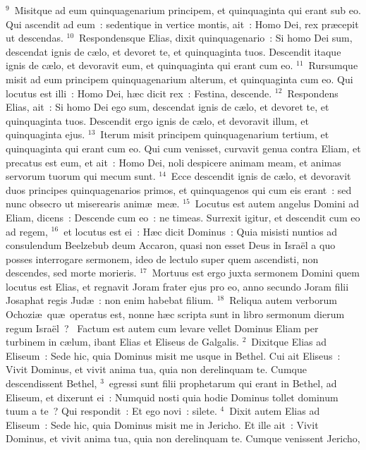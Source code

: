 ${}^{9}$~Misitque ad eum quinquagenarium principem, et quinquaginta qui erant sub eo. Qui ascendit ad eum~: sedentique in vertice montis, ait~: Homo Dei, rex pr\ae cepit ut descendas.
${}^{10}$~Respondensque Elias, dixit quinquagenario~: Si homo Dei sum, descendat ignis de c\ae lo, et devoret te, et quinquaginta tuos. Descendit itaque ignis de c\ae lo, et devoravit eum, et quinquaginta qui erant cum eo.
${}^{11}$~Rursumque misit ad eum principem quinquagenarium alterum, et quinquaginta cum eo. Qui locutus est illi~: Homo Dei, h\ae c dicit rex~: Festina, descende.
${}^{12}$~Respondens Elias, ait~: Si homo Dei ego sum, descendat ignis de c\ae lo, et devoret te, et quinquaginta tuos. Descendit ergo ignis de c\ae lo, et devoravit illum, et quinquaginta ejus.
${}^{13}$~Iterum misit principem quinquagenarium tertium, et quinquaginta qui erant cum eo. Qui cum venisset, curvavit genua contra Eliam, et precatus est eum, et ait~: Homo Dei, noli despicere animam meam, et animas servorum tuorum qui mecum sunt.
${}^{14}$~Ecce descendit ignis de c\ae lo, et devoravit duos principes quinquagenarios primos, et quinquagenos qui cum eis erant~: sed nunc obsecro ut miserearis anim\ae\ me\ae .
${}^{15}$~Locutus est autem angelus Domini ad Eliam, dicens~: Descende cum eo~: ne timeas. Surrexit igitur, et descendit cum eo ad regem,
${}^{16}$~et locutus est ei~: H\ae c dicit Dominus~: Quia misisti nuntios ad consulendum Beelzebub deum Accaron, quasi non esset Deus in Isra\"el a quo posses interrogare sermonem, ideo de lectulo super quem ascendisti, non descendes, sed morte morieris.
${}^{17}$~Mortuus est ergo juxta sermonem Domini quem locutus est Elias, et regnavit Joram frater ejus pro eo, anno secundo Joram filii Josaphat regis Jud\ae~: non enim habebat filium.
${}^{18}$~Reliqua autem verborum Ochozi\ae\ qu\ae\ operatus est, nonne h\ae c scripta sunt in libro sermonum dierum regum Isra\"el~?
~Factum est autem cum levare vellet Dominus Eliam per turbinem in c\ae lum, ibant Elias et Eliseus de Galgalis.
${}^{2}$~Dixitque Elias ad Eliseum~: Sede hic, quia Dominus misit me usque in Bethel. Cui ait Eliseus~: Vivit Dominus, et vivit anima tua, quia non derelinquam te. Cumque descendissent Bethel,
${}^{3}$~egressi sunt filii prophetarum qui erant in Bethel, ad Eliseum, et dixerunt ei~: Numquid nosti quia hodie Dominus tollet dominum tuum a te~? Qui respondit~: Et ego novi~: silete.
${}^{4}$~Dixit autem Elias ad Eliseum~: Sede hic, quia Dominus misit me in Jericho. Et ille ait~: Vivit Dominus, et vivit anima tua, quia non derelinquam te. Cumque venissent Jericho,
